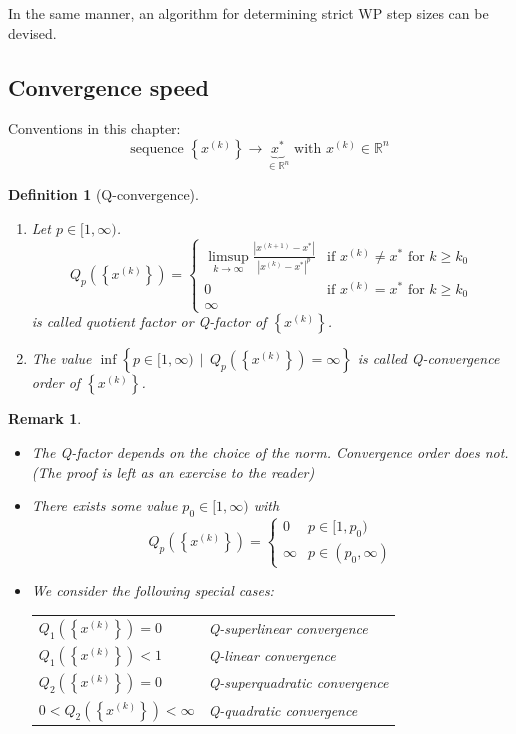\documentclass[a4paper]{article}
\numberwithin{lecref}{subsection}
\newtheorem*{Definition}{Definition}
\newtheorem*{Remark}{Remark}
\newcommand{\Abs}[1]{\left|#1\right|}
\newcommand{\Set}[1]{\left\{#1\right\}}
\newcommand{\SetDef}[2]{\left\{#1\,\mid\,#2\right\}}
\begin{document}
In the same manner, an algorithm for determining strict WP step sizes can be devised.

\subsection{Convergence speed}
\label{section:5}

Conventions in this chapter:
\[ \text{sequence } \Set{x^{(k)}} \to \underbrace{x^*}_{\in \mathbb R^n} \text{ with } x^{(k)} \in \mathbb R^n \]

\begin{Definition}[Q-convergence]
	\begin{enumerate}
		\item
			Let $p \in [1, \infty)$.
			\[
				Q_p\left(\Set{x^{(k)}}\right) = \begin{cases}
					\limsup_{k \to \infty} \frac{\Abs{x^{(k+1)} - x^*}}{\Abs{x^{(k)} - x^*}^p} & \text{if } x^{(k)} \neq x^* \text{ for } k \geq k_0 \\
					0 & \text{if } x^{(k)} = x^* \text{ for } k \geq k_0 \\
					\infty &
				\end{cases}
			\]
			is called \emph{quotient factor} or \emph{Q-factor} of $\Set{x^{(k)}}$.
		\item The value $\inf\SetDef{p \in [1, \infty)}{Q_p(\Set{x^{(k)}}) = \infty}$ is called Q-convergence order of $\Set{x^{(k)}}$.
	\end{enumerate}
\end{Definition}

\begin{Remark}
	\begin{itemize}
		\item The Q-factor depends on the choice of the norm. Convergence order does not. (The proof is left as an exercise to the reader)
		\item There exists some value $p_0 \in [1, \infty)$ with
			\[ Q_p(\Set{x^{(k)}}) = \begin{cases} 0 & p \in [1, p_0) \\ \infty & p \in (p_0, \infty) \end{cases} \]
		\item We consider the following special cases:

			\begin{center}
				\begin{tabular}{ll}
					$Q_1\left(\Set{x^{(k)}}\right) = 0$ & Q-superlinear convergence \\
					$Q_1\left(\Set{x^{(k)}}\right) < 1$ & Q-linear convergence \\
					$Q_2\left(\Set{x^{(k)}}\right) = 0$ & Q-superquadratic convergence \\
					$0 < Q_2\left(\Set{x^{(k)}}\right) < \infty$ & Q-quadratic convergence
				\end{tabular}
			\end{center}
	\end{itemize}
\end{Remark}
\end{document}
